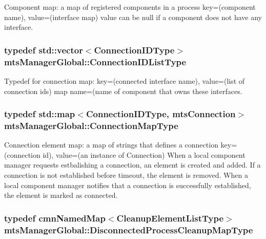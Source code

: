 Component map\-: a map of registered components in a process key=(component name), value=(interface map) value can be null if a component does not have any interface. \hypertarget{classmts_manager_global_a01bcfffc97f320cdd87425bd4bd5bbad}{
\subsubsection[{Connection\-I\-D\-List\-Type}]{\setlength{\rightskip}{0pt plus 5cm}typedef std\-::vector$<${\bf Connection\-I\-D\-Type}$>$ {\bf mts\-Manager\-Global\-::\-Connection\-I\-D\-List\-Type}\hspace{0.3cm}{\ttfamily [protected]}}}\label{classmts_manager_global_a01bcfffc97f320cdd87425bd4bd5bbad}
Typedef for connection map\-: key=(connected interface name), value=(list of connection ids) map name=(name of component that owns these interfaces. \hypertarget{classmts_manager_global_abee7afe21ca1987b873dbfdc3ac2fbfb}{
\subsubsection[{Connection\-Map\-Type}]{\setlength{\rightskip}{0pt plus 5cm}typedef std\-::map$<${\bf Connection\-I\-D\-Type}, {\bf mts\-Connection}$>$ {\bf mts\-Manager\-Global\-::\-Connection\-Map\-Type}\hspace{0.3cm}{\ttfamily [protected]}}}\label{classmts_manager_global_abee7afe21ca1987b873dbfdc3ac2fbfb}
Connection element map\-: a map of strings that defines a connection key=(connection id), value=(an instance of Connection) When a local component manager requests estbalishing a connection, an element is created and added. If a connection is not established before timeout, the element is removed. When a local component manager notifies that a connection is successfully established, the element is marked as connected. \hypertarget{classmts_manager_global_a9df2055466c1e6a041ae3abc266fe507}{
\subsubsection[{Disconnected\-Process\-Cleanup\-Map\-Type}]{\setlength{\rightskip}{0pt plus 5cm}typedef {\bf cmn\-Named\-Map}$<${\bf Cleanup\-Element\-List\-Type}$>$ {\bf mts\-Manager\-Global\-::\-Disconnected\-Process\-Cleanup\-Map\-Type}\hspace{0.3cm}{\ttfamily [protected]}}}\label{classmts_manager_global_a9df2055466c1e6a041ae3abc266fe507}
